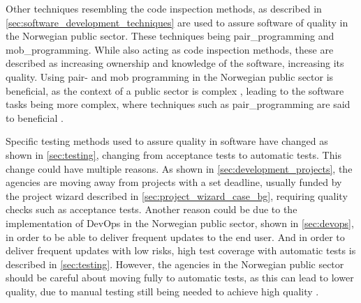 Other techniques resembling the code inspection methods, as described in \autoref{sec:software_development_techniques} are used to assure software of quality in the Norwegian public sector. These techniques being \gls{pair_programming} and \gls{mob_programming}. While also acting as code inspection methods, these are described as increasing ownership and knowledge of the software, increasing its quality. Using pair- and mob programming in the Norwegian public sector is beneficial, as the context of a public sector is complex \cite{jc_2010}, leading to the software tasks being more complex, where techniques such as \gls{pair_programming} are said to beneficial \cite{jeh_2009}. 


Specific testing methods used to assure quality in software have changed as shown in \autoref{sec:testing}, changing from acceptance tests to automatic tests. This change could have multiple reasons. As shown in \autoref{sec:development_projects}, the agencies are moving away from projects with a set deadline, usually funded by the project wizard described in \autoref{sec:project_wizard_case_bg}, requiring quality checks such as acceptance tests. Another reason could be due to the implementation of DevOps in the Norwegian public sector, shown in \autoref{sec:devops}, in order to be able to deliver frequent updates to the end user. And in order to deliver frequent updates with low risks, high test coverage with automatic tests is described in \autoref{sec:testing}. However, the agencies in the Norwegian public sector should be careful about moving fully to automatic tests, as this can lead to lower quality, due to manual testing still being needed to achieve high quality \cite{dsc_2019}. 



